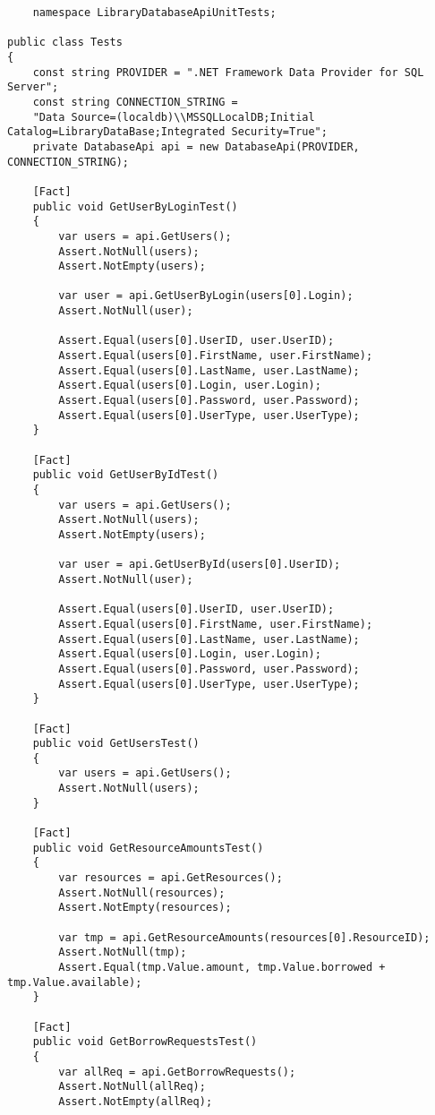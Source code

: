 \begin{verbatim}
    namespace LibraryDatabaseApiUnitTests;

public class Tests
{
    const string PROVIDER = ".NET Framework Data Provider for SQL Server";
    const string CONNECTION_STRING = 
    "Data Source=(localdb)\\MSSQLLocalDB;Initial Catalog=LibraryDataBase;Integrated Security=True";
    private DatabaseApi api = new DatabaseApi(PROVIDER, CONNECTION_STRING);

    [Fact]
    public void GetUserByLoginTest()
    {
        var users = api.GetUsers();
        Assert.NotNull(users);
        Assert.NotEmpty(users);

        var user = api.GetUserByLogin(users[0].Login);
        Assert.NotNull(user);

        Assert.Equal(users[0].UserID, user.UserID);
        Assert.Equal(users[0].FirstName, user.FirstName);
        Assert.Equal(users[0].LastName, user.LastName);
        Assert.Equal(users[0].Login, user.Login);
        Assert.Equal(users[0].Password, user.Password);
        Assert.Equal(users[0].UserType, user.UserType);
    }

    [Fact]
    public void GetUserByIdTest()
    {
        var users = api.GetUsers();
        Assert.NotNull(users);
        Assert.NotEmpty(users);

        var user = api.GetUserById(users[0].UserID);
        Assert.NotNull(user);

        Assert.Equal(users[0].UserID, user.UserID);
        Assert.Equal(users[0].FirstName, user.FirstName);
        Assert.Equal(users[0].LastName, user.LastName);
        Assert.Equal(users[0].Login, user.Login);
        Assert.Equal(users[0].Password, user.Password);
        Assert.Equal(users[0].UserType, user.UserType);
    }

    [Fact]
    public void GetUsersTest()
    {
        var users = api.GetUsers();
        Assert.NotNull(users);
    }

    [Fact]
    public void GetResourceAmountsTest()
    {
        var resources = api.GetResources();
        Assert.NotNull(resources);
        Assert.NotEmpty(resources);

        var tmp = api.GetResourceAmounts(resources[0].ResourceID);
        Assert.NotNull(tmp);
        Assert.Equal(tmp.Value.amount, tmp.Value.borrowed + tmp.Value.available);
    }

    [Fact]
    public void GetBorrowRequestsTest()
    {
        var allReq = api.GetBorrowRequests();
        Assert.NotNull(allReq);
        Assert.NotEmpty(allReq);


\end{verbatim}
